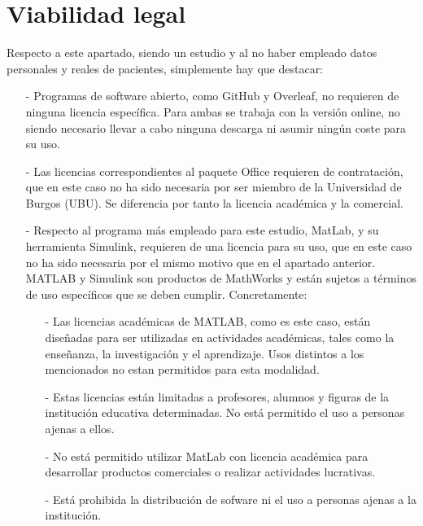 \section{Viabilidad legal}

Respecto a este apartado, siendo un estudio y al no haber empleado datos personales y reales de pacientes, simplemente hay que destacar: 
\begin{enumerate}
    \item[-] Programas de software abierto, como GitHub y Overleaf, no requieren de ninguna licencia específica. Para ambas se trabaja con la versión online, no siendo necesario llevar a cabo ninguna descarga ni asumir ningún coste para su uso.
    \item[-] Las licencias correspondientes al paquete Office requieren de contratación, que en este caso no ha sido necesaria por ser miembro de la Universidad de Burgos (UBU). Se diferencia por tanto la licencia académica y la comercial.
    \item [-] Respecto al programa más empleado para este estudio, MatLab, y su herramienta Simulink, requieren de una licencia para su uso, que en este caso no ha sido necesaria por el mismo motivo que en el apartado anterior. MATLAB y Simulink son productos de MathWorks y están sujetos a términos de uso específicos que se deben cumplir. Concretamente:
    \begin{enumerate}
        \item[-] Las licencias académicas de MATLAB, como es este caso, están diseñadas para ser utilizadas en actividades académicas, tales como la enseñanza, la investigación y el aprendizaje. Usos distintos a los mencionados no estan permitidos para esta modalidad. 
        \item [-] Estas licencias están limitadas a profesores, alumnos y figuras de la institución educativa determinadas. No está permitido el uso a personas ajenas a ellos.
        \item [-] No está permitido utilizar MatLab con licencia académica para desarrollar productos comerciales o realizar actividades lucrativas.
        \item[-] Está prohibida la distribución de sofware ni el uso a personas ajenas a la institución. 
    \end{enumerate}
\end{enumerate}
